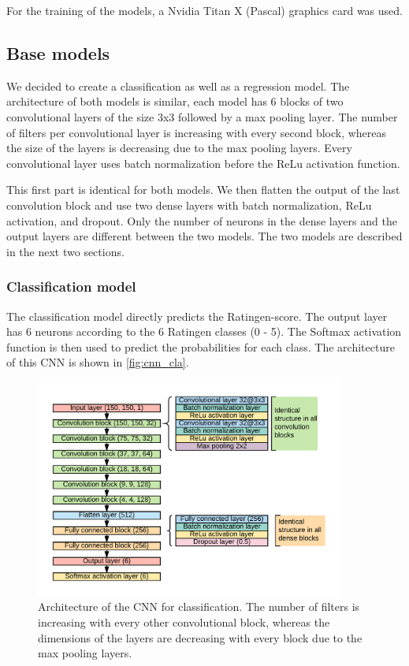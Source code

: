 \documentclass[12pt]{article}
\begin{document}
For the training of the models, a Nvidia Titan X (Pascal) graphics card was used.

\subsection{Base models}

We decided to create a classification as well as a regression model. The architecture of both models is similar, each model has 6 blocks of two convolutional layers of the size 3x3 followed by a max pooling layer. The number of filters per convolutional layer is increasing with every second block, whereas the size of the layers is decreasing due to the max pooling layers. Every convolutional layer uses batch normalization before the ReLu activation function.

This first part is identical for both models. We then flatten the output of the last convolution block and use two dense layers with batch normalization, ReLu activation, and dropout. Only the number of neurons in the dense layers and the output layers are different between the two models. The two models are described in the next two sections.

\subsubsection{Classification model}
\label{subsubsec:clas}

The classification model directly predicts the Ratingen-score. The output layer has 6 neurons according to the 6 Ratingen classes (0 - 5). The Softmax activation function is then used to predict the probabilities for each class. The architecture of this CNN is shown in \autoref{fig:cnn_cla}.

\begin{figure}[ht]
\includegraphics[width=4in]{cnn_classification}	
\caption{Architecture of the CNN for classification. The number of filters is increasing with every other convolutional block, whereas the dimensions of the layers are decreasing with every block due to the max pooling layers.}
\label{fig:cnn_cla}
\end{figure}
\end{document}
